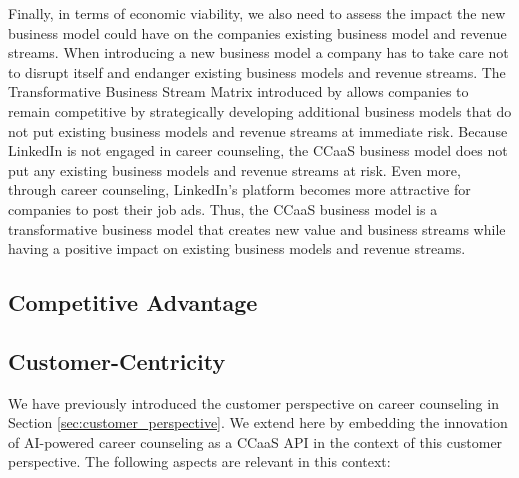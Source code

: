 Finally, in terms of economic viability, we also need to assess the impact the new business model could 
have on the companies existing business model and revenue streams. When introducing a new business model 
a company has to take care not to disrupt itself and endanger existing business models and revenue streams.
The Transformative Business Stream Matrix introduced by \citet{schwafertsTransformativeBusinessStream2016}
allows companies to remain competitive by strategically developing additional business models that do not
put existing business models and revenue streams at immediate risk. Because LinkedIn is not engaged in 
career counseling, the CCaaS business model does not put any existing business models and revenue streams
at risk. Even more, through career counseling, LinkedIn's platform becomes more attractive for companies
to post their job ads. Thus, the CCaaS business model is a transformative business model that creates new
value and business streams while having a positive impact on existing business models and revenue streams.

\subsection{Competitive Advantage}


\subsection{Customer-Centricity}

We have previously introduced the customer perspective on career counseling in Section \ref{sec:customer_perspective}.
We extend here by embedding the innovation of AI-powered career counseling as a CCaaS API in the context of this 
customer perspective. The following aspects are relevant in this context:

